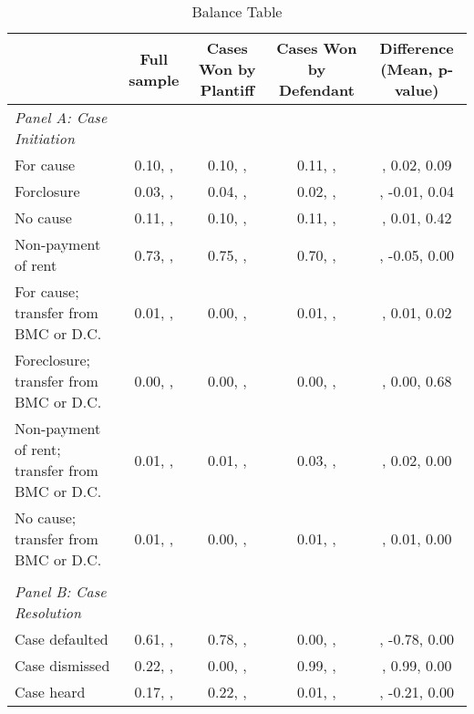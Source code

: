 \begin{table}[htbp]\centering
\def\sym#1{\ifmmode^{#1}\else\(^{#1}\)\fi}
\caption{Balance Table}
\begin{tabular}{l*{4}{c}}
\toprule
                    &\multicolumn{1}{c}{Full sample}&\multicolumn{1}{c}{Cases Won by Plantiff}&\multicolumn{1}{c}{Cases Won by Defendant}&\multicolumn{1}{c}{Difference (Mean, p-value)}\\
\midrule
\emph{Panel A: Case Initiation}&            &            &            &            \\
\hspace{0.25cm}For cause&    0.10, , &    0.10, , &    0.11, , &, 0.02, 0.09\\
\hspace{0.25cm}Forclosure&    0.03, , &    0.04, , &    0.02, , &, -0.01, 0.04\\
\hspace{0.25cm}No cause&    0.11, , &    0.10, , &    0.11, , &, 0.01, 0.42\\
\hspace{0.25cm}Non-payment of rent&    0.73, , &    0.75, , &    0.70, , &, -0.05, 0.00\\
\hspace{0.25cm}For cause; transfer from BMC or D.C.&    0.01, , &    0.00, , &    0.01, , &, 0.01, 0.02\\
\hspace{0.25cm}Foreclosure; transfer from BMC or D.C.&    0.00, , &    0.00, , &    0.00, , &, 0.00, 0.68\\
\hspace{0.25cm}Non-payment of rent; transfer from BMC or D.C.&    0.01, , &    0.01, , &    0.03, , &, 0.02, 0.00\\
\hspace{0.25cm}No cause; transfer from BMC or D.C.&    0.01, , &    0.00, , &    0.01, , &, 0.01, 0.00\\
\vspace{0.1em} \\ \emph{Panel B: Case Resolution}&            &            &            &            \\
\hspace{0.25cm}Case defaulted&    0.61, , &    0.78, , &    0.00, , &, -0.78, 0.00\\
\hspace{0.25cm}Case dismissed&    0.22, , &    0.00, , &    0.99, , &, 0.99, 0.00\\
\hspace{0.25cm}Case heard&    0.17, , &    0.22, , &    0.01, , &, -0.21, 0.00\\

\end{tabular}
\end{table}
